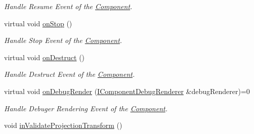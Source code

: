 \begin{DoxyCompactItemize}
\begin{DoxyCompactList}\small\item\em Handle Resume Event of the \hyperlink{class_i_dream_sky_1_1_component}{Component}. \end{DoxyCompactList}\item 
virtual void \hyperlink{class_i_dream_sky_1_1_camera_component_a8c624bffc5605a56fb0fa2eb82c256ba}{on\+Stop} ()\hypertarget{class_i_dream_sky_1_1_camera_component_a8c624bffc5605a56fb0fa2eb82c256ba}{}\label{class_i_dream_sky_1_1_camera_component_a8c624bffc5605a56fb0fa2eb82c256ba}

\begin{DoxyCompactList}\small\item\em Handle Stop Event of the \hyperlink{class_i_dream_sky_1_1_component}{Component}. \end{DoxyCompactList}\item 
virtual void \hyperlink{class_i_dream_sky_1_1_camera_component_aea23765a5cf05c750e92a01e42a5a3b1}{on\+Destruct} ()\hypertarget{class_i_dream_sky_1_1_camera_component_aea23765a5cf05c750e92a01e42a5a3b1}{}\label{class_i_dream_sky_1_1_camera_component_aea23765a5cf05c750e92a01e42a5a3b1}

\begin{DoxyCompactList}\small\item\em Handle Destruct Event of the \hyperlink{class_i_dream_sky_1_1_component}{Component}. \end{DoxyCompactList}\item 
virtual void \hyperlink{class_i_dream_sky_1_1_camera_component_af33eea6a8c6ac26b05cca24336627695}{on\+Debug\+Render} (\hyperlink{class_i_dream_sky_1_1_i_component_debug_renderer}{I\+Component\+Debug\+Renderer} \&debug\+Renderer)=0\hypertarget{class_i_dream_sky_1_1_camera_component_af33eea6a8c6ac26b05cca24336627695}{}\label{class_i_dream_sky_1_1_camera_component_af33eea6a8c6ac26b05cca24336627695}

\begin{DoxyCompactList}\small\item\em Handle Debuger Rendering Event of the \hyperlink{class_i_dream_sky_1_1_component}{Component}. \end{DoxyCompactList}\item 
void \hyperlink{class_i_dream_sky_1_1_camera_component_a84bbd217e6201fd89894e6f8a81e03a9}{in\+Validate\+Projection\+Transform} ()\hypertarget{class_i_dream_sky_1_1_camera_component_a84bbd217e6201fd89894e6f8a81e03a9}{}\label{class_i_dream_sky_1_1_camera_component_a84bbd217e6201fd89894e6f8a81e03a9}


\end{DoxyCompactItemize}
